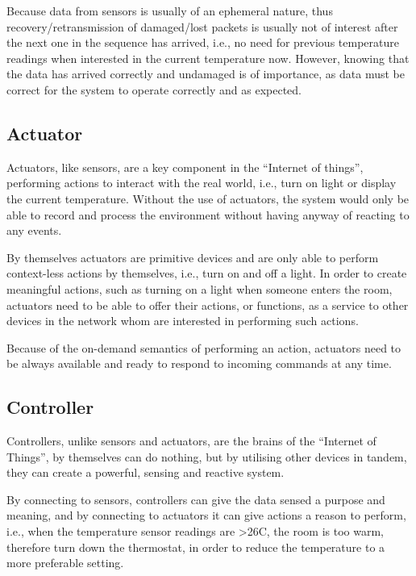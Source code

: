Because data from sensors is usually of an ephemeral nature, thus recovery/retransmission of damaged/lost packets is usually not of interest after the next one in the sequence has arrived, i.e., no need for previous temperature readings when interested in the current temperature now. However, knowing that the data has arrived correctly and undamaged is of importance, as data must be correct for the system to operate correctly and as expected.

\subsection{Actuator} %
\label{sub:actuator}
Actuators, like sensors, are a key component in the ``Internet of things'', performing actions to interact with the real world, i.e., turn on light or display the current temperature. Without the use of actuators, the system would only be able to record and process the environment without having anyway of reacting to any events.

By themselves actuators are primitive devices and are only able to perform context-less actions by themselves, i.e., turn on and off a light. In order to create meaningful actions, such as turning on a light when someone enters the room, actuators need to be able to offer their actions, or functions, as a service to other devices in the network whom are interested in performing such actions.

Because of the on-demand semantics of performing an action, actuators need to be always available and ready to respond to incoming commands at any time. 

\subsection{Controller} %
\label{sub:controller}
Controllers, unlike sensors and actuators, are the brains of the ``Internet of Things'', by themselves can do nothing, but by utilising other devices in tandem, they can create a powerful, sensing and reactive system. 

By connecting to sensors, controllers can give the data sensed a purpose and meaning, and by connecting to actuators it can give actions a reason to perform, i.e., when the temperature sensor readings are \textgreater 26C, the room is too warm, therefore turn down the thermostat, in order to reduce the temperature to a more preferable setting. 

